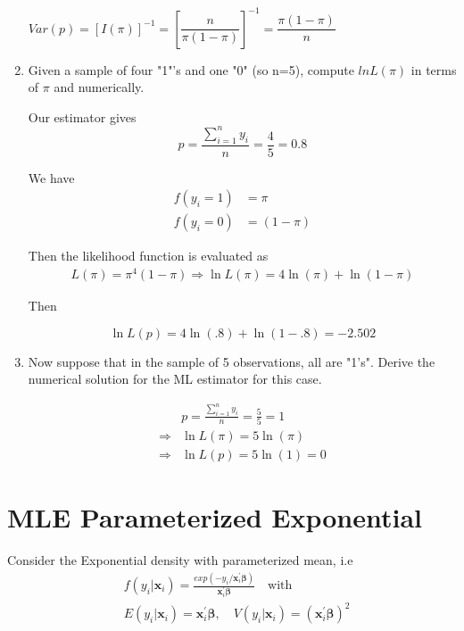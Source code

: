 \documentclass[11pt,reqno]{amsart}\usepackage[]{graphicx}\usepackage[]{color}
\newcommand{\mlt}[1]{\mathbf{#1}} %
\newcommand{\mgr}[1]{\boldsymbol{#1}}%
\newcommand{\ksp}{\vspace{0.1in}}   %
\newcommand{\kl}{\left(}
\newcommand{\kr}{\right)}
\newcommand{\kt}{^{\prime}}
\begin{document}
\begin{enumerate}
$Var(p) =[I(\pi)]^{-1} =[\dfrac{n}{\pi(1-\pi)}]^{-1} = \dfrac{\pi(1-\pi)}{n}$

\item	Given a sample of four "1"'s and one "0" (so n=5), compute $lnL\kl \pi \kr$ in terms of $\pi$ and numerically.

Our estimator gives
$$p=\frac{\sum_{i=1}^{n} y_{i}}{n}=\frac{4}{5}=0.8$$

We have
\begin{equation*}
\begin{split}
f(y_i = 1) &= \pi\\
f(y_i = 0) &= (1 - \pi)
\end{split}
\end{equation*}

Then the likelihood function is evaluated as
\begin{equation*}
\begin{split}
L(\pi)=\pi^{4}(1-\pi) \Rightarrow \ln L(\pi)=4 \ln (\pi)+\ln (1-\pi)
\end{split}
\end{equation*}

Then

$$\ln L(p)=4 \ln (.8)+\ln (1-.8)=-2.502$$

\item	Now suppose that in the sample of 5 observations, all are "1's".  
Derive the numerical solution for the ML estimator for this case. 

\begin{equation*}
\begin{split}
& p=\frac{\sum_{i=1}^{n} y_{i}}{n}=\frac{5}{5}=1\\
\Rightarrow & \ln L(\pi)=5 \ln (\pi)\\
\Rightarrow & \ln L(p)=5 \ln (1)=0
\end{split}
\end{equation*}

\end{enumerate}

\section{MLE Parameterized Exponential}
Consider the Exponential density with parameterized mean, i.e
\begin{equation*}
\begin{split}
&f\kl y_i |\mlt{x}_i\kr = \frac{exp\kl -y_i /\mlt{x}_i\kt\mgr{\beta}\kr}{\mlt{x}_i\kt\mgr{\beta}} \quad \text{with} \\
&E\kl y_i |\mlt{x}_i\kr= \mlt{x}_i\kt\mgr{\beta}, \quad V\kl y_i|\mlt{x}_i\kr = \kl  \mlt{x}_i\kt\mgr{\beta}\kr^2
\end{split}
\end{equation*}
\ksp
\end{document}
